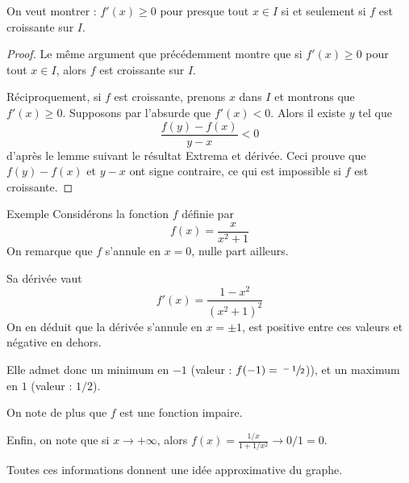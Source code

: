 \begin{frame}%
  \begin{rappel}
    On veut montrer : \(f'(x) \geq 0\) pour presque tout \(x \in I\) si et seulement si \(f\) est croissante sur \(I\).
  \end{rappel}
  \begin{proof}
    Le même argument que précédemment montre que si \(f'(x) \geq 0\) pour tout \(x \in I\), alors \(f\) est croissante sur \(I\).\pause{}

    Réciproquement, si \(f\) est croissante, prenons \(x\) dans \(I\) et montrons que \(f'(x) \geq 0\). Supposons par l'absurde que \(f'(x) < 0\).\pause{} Alors il existe \(y\) tel que
    \begin{equation*}
      \frac{f(y)-f(x)}{y-x} < 0
    \end{equation*}
    d'après le lemme suivant le résultat \og Extrema et dérivée\fg{}.\pause{} Ceci prouve que \(f(y)-f(x)\) et \(y-x\) ont signe contraire, ce qui est impossible si \(f\) est croissante.
  \end{proof}
\end{frame}
\begin{frame}{Exemple}%
  Considérons la fonction \(f\) définie par
  \begin{equation*}
    f(x) =\frac{x}{x^{2} + 1}
  \end{equation*}\pause
  On remarque que \(f\) s'annule en \(x = 0\), nulle part ailleurs.\pause

  Sa dérivée vaut\pause
  \begin{equation*}
    f'(x) = \frac{1 - x^{2}}{(x^{2}+1)^{2}}
  \end{equation*}\pause
  On en déduit que la dérivée s'annule en \(x = \pm 1\), est positive entre ces valeurs et négative en dehors.\pause

  Elle admet donc un minimum en \(-1\) (valeur : \(f(-1) = \sfrac{-1}{2}\))), et un maximum en \(1\) (valeur : \(1/2\)).\pause

  On note de plus que \(f\) est une fonction impaire.\pause

  Enfin, on note que si \(x \to +\infty\), alors \(f(x)  = \frac{1/x}{1 + 1/x^{2}}\to 0/1 = 0\).\pause

  Toutes ces informations donnent une idée approximative du graphe.
\end{frame}

